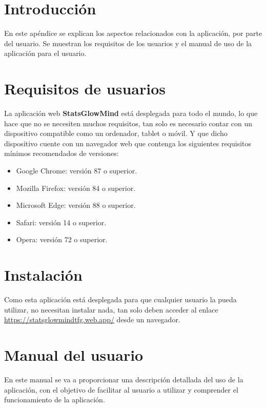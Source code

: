
\section{Introducción}

En este apéndice se explican los aspectos relacionados con la aplicación, por parte del usuario. Se muestran los requisitos de los usuarios y el manual de uso de la aplicación para el usuario.

\section{Requisitos de usuarios}

La aplicación web \textbf{StatsGlowMind} está desplegada para todo el mundo, lo que hace que no se necesiten muchos requisitos, tan solo es necesario contar con un dispositivo compatible como un ordenador, tablet o móvil. Y que dicho dispositivo cuente con un navegador web que contenga los siguientes requisitos mínimos recomendados de versiones:

\begin{itemize}
\tightlist
    \item Google Chrome: versión 87 o superior.
    \item Mozilla Firefox: versión 84 o superior.
    \item Microsoft Edge: versión 88 o superior.
    \item Safari: versión 14 o superior.
    \item Opera: versión 72 o superior.
\end{itemize}

\section{Instalación}

Como esta aplicación está desplegada para que cualquier usuario la pueda utilizar, no necesitan instalar nada, tan solo deben acceder al enlace \url{https://statsglowmindtfg.web.app/} desde un navegador.

\section{Manual del usuario}

En este manual se va a proporcionar una descripción detallada del uso de la aplicación, con el objetivo de facilitar al usuario a utilizar y comprender el funcionamiento de la aplicación.

